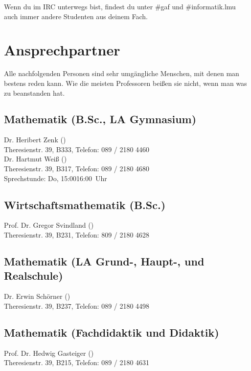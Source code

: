 Wenn du im IRC unterwegs bist, findest du unter \#gaf und \#informatik.lmu
auch immer andere Studenten aus deinem Fach.

\begin{urlList}
\end{urlList}

\section{Ansprechpartner}

Alle nachfolgenden Personen sind sehr umgängliche Menschen, mit denen
man bestens reden kann. Wie die meisten Professoren beißen sie nicht,
wenn man was zu beanstanden hat.

\subsection*{Mathematik (B.Sc., LA Gymnasium)}
Dr. Heribert Zenk ()\\
Theresienstr. 39, B333, Telefon: 089 / 2180 \emd{} 4460\\

Dr. Hartmut Weiß ()\\
Theresienstr. 39, B317, Telefon: 089 / 2180 \emd{} 4680\\
Sprechstunde: Do, 15:00\emd{}16:00~Uhr

\subsection*{Wirtschaftsmathematik (B.Sc.)}
Prof. Dr. Gregor Svindland ()\\
Theresienstr. 39, B231, Telefon: 809 / 2180 \emd{} 4628\\

\subsection*{Mathematik (LA Grund-, Haupt-, und Realschule)}
Dr. Erwin Schörner ()\\
Theresienstr. 39, B237, Telefon: 089 / 2180 \emd{} 4498\\

\subsection*{Mathematik (Fachdidaktik und Didaktik)}
Prof. Dr. Hedwig Gasteiger ()\\
Theresienstr. 39, B215, Telefon: 089 / 2180 \emd{} 4631\\

